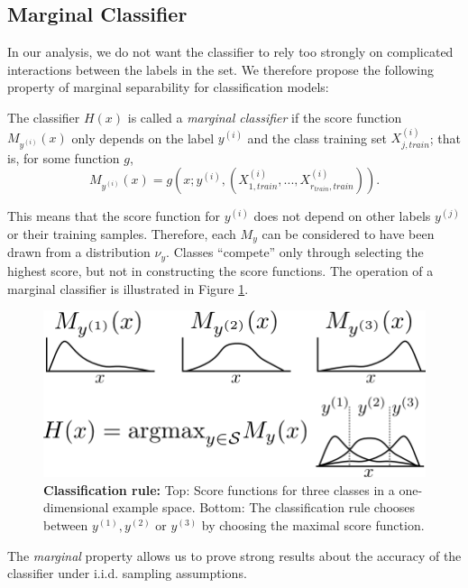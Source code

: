\documentclass[twoside,11pt]{article}
\begin{document}
\subsection{Marginal Classifier}

In our analysis, we do not want the classifier to rely too strongly on
complicated interactions between the labels in the set. We therefore
propose the following property of marginal separability for
classification models:

\begin{definition}
The classifier $H(x)$ is called a \emph{marginal classifier} if the
score function $M_{y^{(i)}}(x)$ only depends on the label $y^{(i)}$
and the class training set $X_{j, train}^{(i)}$; that is, for some function $g$,
\[M_{y^{(i)}}(x) = g(x; y^{(i)},(X_{1, train}^{(i)},...,X_{r_{train}, train}^{(i)})).\]
\end{definition}
This means that the score function for $y^{(i)}$ does not depend on
other labels $y^{(j)}$ or their training samples.  Therefore, each
$M_y$ can be considered to have been drawn from a distribution
$\nu_y$.  Classes ``compete'' only through selecting the highest
score, but not in constructing the score functions.  The operation of
a marginal classifier is illustrated in Figure
\ref{fig:classification_rule}.


\begin{figure}[t]
\centering
\includegraphics[scale = 0.4]{classification_rule.png}
\caption{\textbf{Classification rule:} Top: Score functions for three classes in a one-dimensional example space. Bottom: The classification rule chooses between $y^{(1)},y^{(2)}$ or $y^{(3)}$ by choosing the maximal score function. 
}
\label{fig:classification_rule}
\end{figure}

The \emph{marginal} property allows us to prove
strong results about the accuracy of the classifier under
i.i.d. sampling assumptions.
\end{document}
